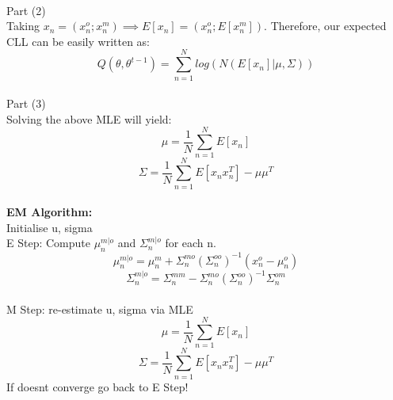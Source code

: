 \documentclass[a4paper,11pt]{article}
\begin{document}
\begin{mlsolution}
\noindent \\Part (2) \\
Taking $x_{n} = (x_{n}^{o}; x_{n}^{m})\implies E[x_{n}] = (x_{n}^{o}; E[x_{n}^{m}])$. Therefore, our expected CLL can be easily written as:
\begin{equation}
  Q(\theta, \theta^{t-1}) = \sum_{n=1}^{N} log(N(E[x_{n}]|\mu, \Sigma))
\end{equation}
\\Part (3) \\
Solving the above MLE will yield:
\begin{equation}
  \mu = \frac{1}{N} \sum_{n=1}^{N}E[x_{n}]
\end{equation}
\begin{equation}
  \Sigma = \frac{1}{N} \sum_{n=1}^{N}E[x_{n}x_{n}^{T}] - \mu\mu^{T}
\end{equation}
\\
\textbf{EM Algorithm:}
\\ Initialise u, sigma\\
E Step: Compute $\mu_{n}^{m|o}$ and $\Sigma_{n}^{m|o}$ for each n.\\
\begin{equation}
  \mu_{n}^{m|o} = \mu_{n}^{m} + \Sigma_{n}^{mo}(\Sigma_{n}^{oo})^{-1}(x_{n}^{o} - \mu_{n}^{o})
\end{equation}
\begin{equation}
  \Sigma_{n}^{m|o} = \Sigma_{n}^{mm} - \Sigma_{n}^{mo}(\Sigma_{n}^{oo})^{-1}\Sigma_{n}^{om}
\end{equation}
\\
M Step: re-estimate u, sigma via MLE
\begin{equation}
  \mu = \frac{1}{N} \sum_{n=1}^{N}E[x_{n}]
\end{equation}
\begin{equation}
  \Sigma = \frac{1}{N} \sum_{n=1}^{N}E[x_{n}x_{n}^{T}] - \mu\mu^{T}
\end{equation}
If doesnt converge go back to E Step!

\end{mlsolution}
\end{document}
